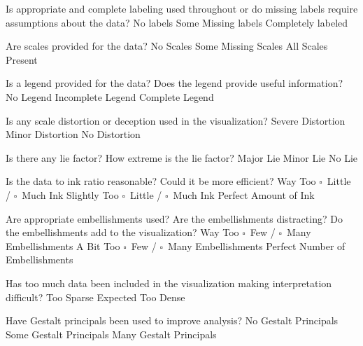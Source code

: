 \documentclass[a4paper,12pt]{article}
\begin{document}
\EndTable  

\vspace{15pt}


   	{Is appropriate and complete labeling used throughout or do 
      	missing labels require assumptions about the data?}
    {\choice No labels}
    {\choice Some Missing labels}
    {\choice Completely labeled} 
        
   	{Are scales provided for the data?}
	{\choice No Scales}
	{\choice Some Missing Scales}
	{\choice All Scales Present} 

	{Is a legend provided for the data? Does the legend provide useful 
    	information?}
	{\choice No Legend}
	{\choice Incomplete Legend}
	{\choice Complete Legend} 
        
        
\EndTable  



	{Is any scale distortion or deception used in the visualization?}	
	{\choice Severe Distortion}
	{\choice Minor Distortion}
	{\choice No Distortion} 
        
	{Is there any lie factor? How extreme is the lie factor?}
	{\choice Major Lie}
	{\choice Minor Lie}
	{\choice No Lie} 

	{Is the data to ink ratio reasonable? Could it be more efficient?}
	{Way Too $\square$~Little / $\square$~Much Ink}
	{Slightly Too $\square$~Little / $\square$~Much Ink}
	{\choice Perfect Amount of Ink} 
        
	{Are appropriate embellishments used? Are the embellishments 
    	distracting? Do the embellishments add to the visualization?}
	{Way Too $\square$~Few / $\square$~Many Embellishments}
	{A Bit Too $\square$~Few / $\square$~Many Embellishments}
	{\choice Perfect Number of Embellishments} 
        
	{Has too much data been included in the visualization making 
    	interpretation difficult? } 
	{\choice Too Sparse}
	{\choice Expected}
	{\choice Too Dense} 
        
        
	{Have Gestalt principals been used to improve analysis?}
	{\choice No Gestalt Principals}
	{\choice Some Gestalt Principals}
	{\choice Many Gestalt Principals} 
        
\end{document}
